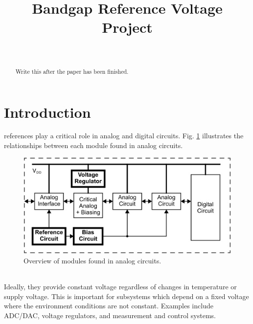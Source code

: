 \documentclass[conference]{IEEEtran}
\begin{document}
%
\title{Bandgap Reference Voltage Project}

\author{
\\
\and
{}
\and
{}
}

\maketitle

\begin{abstract}
Write this after the paper has been finished.
\end{abstract}
\IEEEpeerreviewmaketitle

\section{Introduction}
 references play a critical role in analog and digital circuits.  Fig. \ref{fig:overview} illustrates the relationships between each module found in analog circuits.
\begin{figure}[htb]
  \centering
  \includegraphics[scale=0.25]{images/overview.png}
  \caption[Overview]{Overview of modules found in analog circuits.\footnotemark}
  \label{fig:overview}
\end{figure}
\\Ideally, they provide constant voltage regardless of changes in temperature or supply voltage.  This is important for subsystems which depend on a fixed voltage where the environment conditions are not constant.  Examples include ADC/DAC, voltage regulators, and measurement and control systems.
\end{document}
